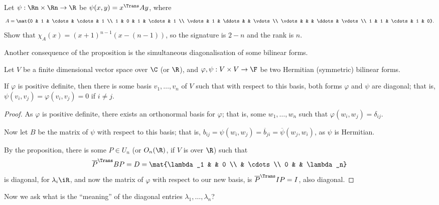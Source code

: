 \begin{exercise}
	Let $\psi:\Rn\times\Rn \to \R$ be $\psi(x,y)=x^\Trans Ay$, where %
	\begin{equation*}
		A = \mat{0 & 1 & \cdots & \cdots & 1 \\ 1 & 0 & 1 & \cdots & 1 \\ \vdots & 1 & \ddots & & \vdots \\ \vdots & & & \ddots & \vdots \\ 1 & 1 & \cdots & 1 & 0}. %
	\end{equation*}
	Show that $\chi_A(x)=\left( x+1 \right)^{n-1}\left( x-\left( n-1 \right) \right)$, so the signature is $2-n$ and the rank is $n$. %
	
\end{exercise}
	Another consequence of the proposition is the simultaneous diagonalisation of some bilinear forms. %

\begin{theorem}
	Let $V$ be a finite dimensional vector space over $\C$ (or $\R$), and $\varphi,\psi:V\times V\to\F$ be two Hermitian (symmetric) bilinear forms. %
	
	If $\varphi$ is positive definite, then there is some basis $v_1,\ldots,v_n$ of $V$ such that with respect to this basis, both forms $\varphi$ and $\psi$ are diagonal; that is, $\psi(v_i,v_j) = \varphi(v_i,v_j) = 0$ if $i\neq j$. %
\end{theorem}

\begin{proof}
	As $\varphi$ is positive definite, there exists an orthonormal basis for $\varphi$; that is, some $w_1,\ldots,w_n$ such that $\varphi(w_i,w_j)=\delta_{ij}$. %
	
	Now let $B$ be the matrix of $\psi$ with respect to this basis; that is, $b_{ij} = \psi(w_i,w_j) = \overline{b}_{ji} = \overline{\psi}(w_j,w_i)$, as $\psi$ is Hermitian. %
	
	By the proposition, there is some $P\in U_n$ (or $O_n(\R)$, if $V$ is over $\R$) such that %
	\begin{equation*}
		\herm{P} BP = D = \mat{\lambda_1 & & 0 \\ & \cdots \\ 0 & & \lambda_n}
	\end{equation*}
	is diagonal, for $\lambda_i\iR$, and now the matrix of $\varphi$ with respect to our new basis, is $\herm{P}IP=I$, also diagonal. %
\end{proof}

Now we ask what is the ``meaning'' of the diagonal entries $\lambda_1,\ldots,\lambda_n$?

